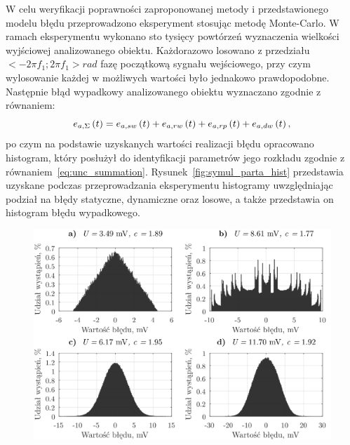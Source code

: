W celu weryfikacji poprawności zaproponowanej metody i przedstawionego modelu błędu przeprowadzono eksperyment stosując metodę Monte-Carlo. W ramach eksperymentu wykonano sto tysięcy powtórzeń wyznaczenia wielkości wyjściowej analizowanego obiektu. Każdorazowo losowano z przedziału $<-2 \pi f_{1};2 \pi f_{1}>\unit{rad}$ fazę początkową sygnału wejściowego, przy czym wylosowanie każdej w możliwych wartości było jednakowo prawdopodobne. Następnie błąd wypadkowy analizowanego obiektu wyznaczano zgodnie z równaniem:
\begin{equation}
e_{a,\Sigma} \left(t\right) = e_{a,sw} \left(t\right) + e_{a,rw} \left(t\right) + e_{a,rp} \left(t\right) + e_{a,dw} \left(t\right) \label{eq:sym_parta_error_sum},
\end{equation}
po czym na podstawie uzyskanych wartości realizacji błędu opracowano histogram, który posłużył do identyfikacji parametrów jego rozkładu zgodnie z równaniem~\eqref{eq:unc_summation}. Rysunek~\ref{fig:symul_parta_hist} przedstawia uzyskane podczas przeprowadzania eksperymentu histogramy uwzględniając podział na błędy statyczne, dynamiczne oraz losowe, a także przedstawia on histogram błędu wypadkowego.

\begin{figure}[htb!]
\begin{center}
\includegraphics{obrazki/hist_part_a}
\end{center}
\end{figure}

